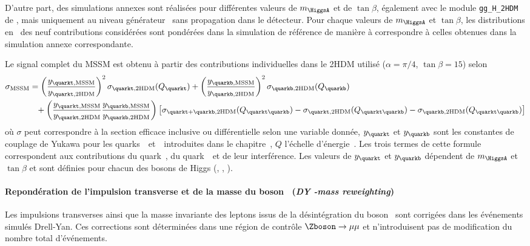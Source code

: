 \par
D'autre part, des simulations annexes sont réalisées pour différentes valeurs de $m_{\HiggsA}$ et de $\tan\beta$, également avec le  module \texttt{gg\_H\_2HDM} de \POWHEG, mais uniquement au niveau générateur \ie\ sans propagation dans le détecteur.
Pour chaque valeurs de $m_{\HiggsA}$ et $\tan\beta$, les distributions en \pT\ des neuf contributions considérées sont pondérées dans la simulation de référence de manière à correspondre à celles obtenues dans la simulation annexe correspondante.
\par
Le signal complet du MSSM est obtenu à partir des contributions individuelles dans le 2HDM utilisé ($\alpha=\pi/4$, $\tan\beta=15$) selon
\begin{align}
\sigma_\text{MSSM} &=
\left(\frac{y_{\quarkt,\text{MSSM}}}{y_{\quarkt,\text{2HDM}}}\right)^2 \sigma_{\quarkt,\text{2HDM}}(Q_{\quarkt})
+
\left(\frac{y_{\quarkb,\text{MSSM}}}{y_{\quarkb,\text{2HDM}}}\right)^2 \sigma_{\quarkb,\text{2HDM}}(Q_{\quarkb})
\nonumber\\&\hphantom{=}
+
\left(\frac{y_{\quarkt,\text{MSSM}}}{y_{\quarkt,\text{2HDM}}}\frac{y_{\quarkb,\text{MSSM}}}{y_{\quarkb,\text{2HDM}}}\right)
\left[ \sigma_{\quarkt+\quarkb,\text{2HDM}}(Q_{\quarkt\quarkb}) - \sigma_{\quarkt,\text{2HDM}}(Q_{\quarkt\quarkb}) - \sigma_{\quarkb,\text{2HDM}}(Q_{\quarkt\quarkb}) \right]
\label{eq-2HDM_to_MSSM_xsec}
\end{align}
où $\sigma$ peut correspondre à la section efficace inclusive ou différentielle selon une variable donnée,
$y_{\quarkt}$ et $y_{\quarkb}$ sont les constantes de couplage de Yukawa pour les quarks~\quarkt\ et~\quarkb\ introduites dans le chapitre~,
$Q$ l'échelle d'énergie~\cite{Bagnaschi:2015qta,Bagnaschi:2015bop}.
Les trois termes de cette formule correspondent aux contributions du quark~\quarkt, du quark~\quarkb\ et de leur interférence.
Les valeurs de $y_{\quarkt}$ et $y_{\quarkb}$ dépendent de $m_{\HiggsA}$ et $\tan\beta$ et sont définies pour chacun des bosons de Higgs (\higgs, \Higgs, \HiggsA).
\paragraph{Repondération de l'impulsion transverse et de la masse du boson \Zboson\ (\emph{DY \pT-mass reweighting})}
Les impulsions transverses ainsi que la masse invariante des leptons issus de la désintégration du boson \Zboson\ sont corrigées
dans les événements simulés Drell-Yan.
Ces corrections sont déterminées dans une région de contrôle $\Zboson\to\mu\mu$ et n'introduisent pas de modification du nombre total d'événements.

